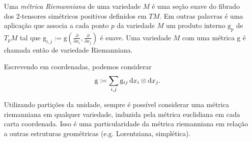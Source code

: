 \begin{definicao}
	Uma \textit{métrica Riemanniana} de uma variedade $M$ é uma seção suave do fibrado dos 2-tensores simétricos positivos definidos em $TM$. Em outras palavras é uma aplicação que associa a cada ponto $p$ da variedade $M$ um produto interno $\mathrm{g}_p$ de $T_p M$ tal que $\mathrm{g}_{i, j}:=\mathrm{g}\left(\frac{\partial}{\partial x_i}, \frac{\partial}{\partial x_j}\right)$ é suave. Uma variedade $M$ com uma métrica $\mathrm g$ é chamada então de variedade Riemanniana.
\end{definicao}

Escrevendo em coordenadas, podemos considerar
\begin{equation*}
	\mathrm g \coloneqq \sum_{i,j} \mathrm g_{ij}\,{\operatorname{d}}{x}_i \otimes {\operatorname{d}}{x}_j.
\end{equation*}

Utilizando partições da unidade, sempre é possível considerar uma métrica riemanniana em qualquer variedade, induzida pela métrica euclidiana em cada carta coordenada. Isso é uma particularidade da métrica riemanniana em relação a outras estruturas geométricas (e.g. Lorentziana, simplética).
